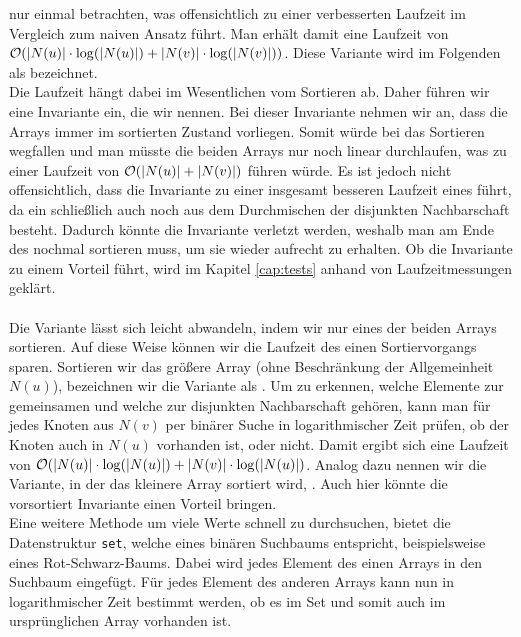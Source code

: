 nur einmal betrachten, was offensichtlich zu einer verbesserten Laufzeit im Vergleich zum naiven
Ansatz führt. Man erhält damit eine Laufzeit von $\mathcal{O}(|N(u)|\cdot \log (|N(u)|)  + |N(v)|\cdot\log(|N(v)|))$. 
Diese Variante wird im Folgenden als \SorSor{} bezeichnet. 
\\
Die Laufzeit hängt dabei im Wesentlichen vom Sortieren ab. Daher führen wir eine Invariante ein, 
die wir  nennen. Bei dieser Invariante nehmen wir an, dass
die Arrays immer im sortierten Zustand vorliegen. Somit würde bei \SorSor{} das Sortieren wegfallen
und man müsste die beiden Arrays nur noch linear durchlaufen, was zu einer Laufzeit von $\mathcal{O}(|N(u)| + |N(v)|)$
führen würde. 
Es ist jedoch nicht offensichtlich, dass die Invariante zu einer insgesamt besseren Laufzeit eines
 führt, da ein \ct{} schließlich auch noch aus dem Durchmischen der disjunkten Nachbarschaft besteht.
Dadurch könnte die Invariante verletzt werden, weshalb man am Ende des  nochmal sortieren
muss, um sie wieder aufrecht zu erhalten. Ob die Invariante zu einem Vorteil führt, wird im Kapitel 
\ref{cap:tests} anhand von Laufzeitmessungen geklärt.
\\
\\
Die Variante \SorSor{} lässt sich leicht abwandeln, indem wir nur eines der beiden Arrays sortieren.
Auf diese Weise können wir die Laufzeit des einen Sortiervorgangs sparen. Sortieren
wir das größere Array (ohne Beschränkung der Allgemeinheit $N(u)$), bezeichnen wir die Variante als \SorSea{}. Um zu erkennen, 
welche Elemente zur gemeinsamen und welche zur disjunkten Nachbarschaft gehören, kann man für jedes
Knoten aus $N(v)$ per binärer Suche in logarithmischer Zeit prüfen, ob der Knoten auch in $N(u)$ vorhanden ist, oder nicht.
Damit ergibt sich eine Laufzeit von $\mathcal{O}(|N(u)| \cdot \log(|N(u)|) + |N(v)| \cdot \log(|N(u)|)$. Analog dazu
nennen wir die Variante, in der das kleinere Array sortiert wird, \SeaSor. 
Auch hier könnte die vorsortiert Invariante einen Vorteil bringen.
\\
Eine weitere Methode um viele Werte schnell zu durchsuchen, bietet die Datenstruktur \texttt{set}, welche
eines binären Suchbaums entspricht, beispielsweise eines Rot-Schwarz-Baums.
Dabei wird jedes Element des einen Arrays in den Suchbaum eingefügt. 
Für jedes Element des anderen Arrays kann nun in logarithmischer
Zeit bestimmt werden, ob es im Set und somit auch im ursprünglichen Array vorhanden ist.
\\ 
